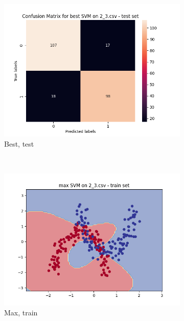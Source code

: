 \documentclass[12pt]{article}
\newcommand*{\subfigwidth}{0.24\textwidth}
\begin{document}
\begin{figure}[H]
\begin{subfigure}[t]{\subfigwidth}
        \includegraphics[width=\linewidth]{img/exp_2/svm/2_3/best/test_matrix.png}
        \caption{Best, test}
    \end{subfigure} 
    \\
    \begin{subfigure}[t]{\subfigwidth}
        \includegraphics[width=\linewidth]{img/exp_2/svm/2_3/max/train_boundary.png}
        \caption{Max, train}
    \end{subfigure}
    \hfill
    \begin{subfigure}[t]{\subfigwidth}

\end{subfigure}
\end{figure}
\end{document}
